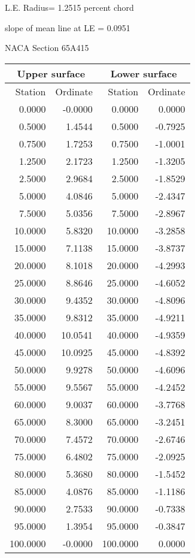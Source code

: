 \documentclass[11pt]{book}
\begin{document}
L.E. Radius=  1.2515 percent chord


 slope of mean line at LE =  0.0951
 \newpage
  \label{s65A415}
 \begin{Large}
 NACA Section 65A415
 \end{Large}
  
 \vspace{8mm}
 \begin{tabular}{|r|r|r|r|} \hline 
 \multicolumn{2}{|c|}{Upper surface} & \multicolumn{2}{|c|}{Lower surface} \\
 \hline
 Station & Ordinate & Station & Ordinate \\
 \hline
0.0000 & -0.0000 & 0.0000 & 0.0000 \\
0.5000 & 1.4544 & 0.5000 & -0.7925 \\
0.7500 & 1.7253 & 0.7500 & -1.0001 \\
1.2500 & 2.1723 & 1.2500 & -1.3205 \\
2.5000 & 2.9684 & 2.5000 & -1.8529 \\
5.0000 & 4.0846 & 5.0000 & -2.4347 \\
7.5000 & 5.0356 & 7.5000 & -2.8967 \\
10.0000 & 5.8320 & 10.0000 & -3.2858 \\
15.0000 & 7.1138 & 15.0000 & -3.8737 \\
20.0000 & 8.1018 & 20.0000 & -4.2993 \\
25.0000 & 8.8646 & 25.0000 & -4.6052 \\
30.0000 & 9.4352 & 30.0000 & -4.8096 \\
35.0000 & 9.8312 & 35.0000 & -4.9211 \\
40.0000 & 10.0541 & 40.0000 & -4.9359 \\
45.0000 & 10.0925 & 45.0000 & -4.8392 \\
50.0000 & 9.9278 & 50.0000 & -4.6096 \\
55.0000 & 9.5567 & 55.0000 & -4.2452 \\
60.0000 & 9.0037 & 60.0000 & -3.7768 \\
65.0000 & 8.3000 & 65.0000 & -3.2451 \\
70.0000 & 7.4572 & 70.0000 & -2.6746 \\
75.0000 & 6.4802 & 75.0000 & -2.0925 \\
80.0000 & 5.3680 & 80.0000 & -1.5452 \\
85.0000 & 4.0876 & 85.0000 & -1.1186 \\
90.0000 & 2.7533 & 90.0000 & -0.7338 \\
95.0000 & 1.3954 & 95.0000 & -0.3847 \\
100.0000 & -0.0000 & 100.0000 & 0.0000 \\
 \hline 
 \end{tabular}
\end{document}
